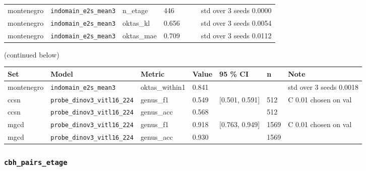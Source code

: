 \begin{center}
{\begin{tabular}{lllllll}
montenegro & \texttt{indomain\_\allowbreak{}e2s\_\allowbreak{}mean3} & n\_etage & 446 &  &  & std over 3 seeds 0.0000 \\
montenegro & \texttt{indomain\_\allowbreak{}e2s\_\allowbreak{}mean3} & oktas\_kl & 0.656 &  &  & std over 3 seeds 0.0054 \\
montenegro & \texttt{indomain\_\allowbreak{}e2s\_\allowbreak{}mean3} & oktas\_mae & 0.709 &  &  & std over 3 seeds 0.0112 \\
\bottomrule
\end{tabular}}\par\footnotesize(continued below)
\end{center}

\begin{center}{\scriptsize\setlength{\tabcolsep}{3pt}
\begin{tabular}{lllllll}
\toprule
Set & Model & Metric & Value & 95 \% CI & n & Note \\
\midrule
montenegro & \texttt{indomain\_\allowbreak{}e2s\_\allowbreak{}mean3} & oktas\_within1 & 0.841 &  &  & std over 3 seeds 0.0018 \\
ccsn & \texttt{probe\_\allowbreak{}dinov3\_\allowbreak{}vitl16\_\allowbreak{}224} & genus\_f1 & 0.549 & [0.501, 0.591] & 512 & C 0.01 chosen on val \\
ccsn & \texttt{probe\_\allowbreak{}dinov3\_\allowbreak{}vitl16\_\allowbreak{}224} & genus\_acc & 0.568 &  & 512 &  \\
mgcd & \texttt{probe\_\allowbreak{}dinov3\_\allowbreak{}vitl16\_\allowbreak{}224} & genus\_f1 & 0.918 & [0.763, 0.949] & 1569 & C 0.01 chosen on val \\
mgcd & \texttt{probe\_\allowbreak{}dinov3\_\allowbreak{}vitl16\_\allowbreak{}224} & genus\_acc & 0.930 &  & 1569 &  \\
\bottomrule
\end{tabular}}
\end{center}

\subsubsection{\texttt{cbh\_\allowbreak{}pairs\_\allowbreak{}etage}}

